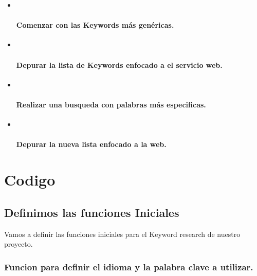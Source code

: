 \documentclass[11pt]{article}
\begin{document}
\begin{itemize}
\item ~
  \hypertarget{comenzar-con-las-keywords-muxe1s-genuxe9ricas.}{%
  \paragraph{Comenzar con las Keywords más
  genéricas.}\label{comenzar-con-las-keywords-muxe1s-genuxe9ricas.}}
\item ~
  \hypertarget{depurar-la-lista-de-keywords-enfocado-a-el-servicio-web.}{%
  \paragraph{Depurar la lista de Keywords enfocado a el servicio
  web.}\label{depurar-la-lista-de-keywords-enfocado-a-el-servicio-web.}}
\item ~
  \hypertarget{realizar-una-busqueda-con-palabras-muxe1s-especificas.}{%
  \paragraph{Realizar una busqueda con palabras más
  especificas.}\label{realizar-una-busqueda-con-palabras-muxe1s-especificas.}}
\item ~
  \hypertarget{depurar-la-nueva-lista-enfocado-a-la-web.}{%
  \paragraph{Depurar la nueva lista enfocado a la
  web.}\label{depurar-la-nueva-lista-enfocado-a-la-web.}}
\end{itemize}

    \hypertarget{codigo}{%
\section{Codigo}\label{codigo}}

    \hypertarget{definimos-las-funciones-iniciales}{%
\subsection{Definimos las funciones
Iniciales}\label{definimos-las-funciones-iniciales}}

Vamos a definir las funciones iniciales para el Keyword research de
nuestro proyecto.

    \hypertarget{funcion-para-definir-el-idioma-y-la-palabra-clave-a-utilizar.}{%
\subsubsection{Funcion para definir el idioma y la palabra clave a
utilizar.}\label{funcion-para-definir-el-idioma-y-la-palabra-clave-a-utilizar.}}
\end{document}
